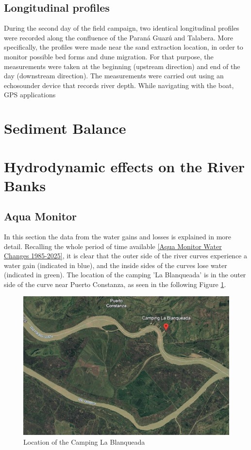 \subsection{Longitudinal profiles}
During the second day of the field campaign, two identical longitudinal profiles were recorded along the confluence of the Paraná Guazú and Talabera. More specifically, the profiles were made near the sand extraction location, in order to monitor possible bed forms and dune migration. For that purpose, the measurements were taken at the beginning (upstream direction) and end of the day (downstream direction). The measurements were carried out using an echosounder device that records river depth. While navigating with the boat, GPS applications



\section{Sediment Balance}
\label{sec: Sediment Balance}






\section{Hydrodynamic effects on the River Banks}
\subsection{Aqua Monitor}
\label{section:cirtical_location}
In this section the data from the water gains and losses is explained in more detail.
Recalling the whole period of time available \ref{Aqua Monitor Water Changes 1985-2025}, it is clear that the outer side of the river curves experience a water gain (indicated in blue), and the inside sides of the curves lose water (indicated in green). 
The location of the camping 'La Blanqueada' is in the outer side of the curve near Puerto Constanza, as seen in the following Figure \ref{fig:Camping Blanqueada}.

\begin{figure}[H]
    \centering
    \includegraphics[width=0.5\linewidth]{figures/ch5/Camping Blanqueada.png}
    \caption{Location of the Camping La Blanqueada}
    \label{fig:Camping Blanqueada}
\end{figure}

